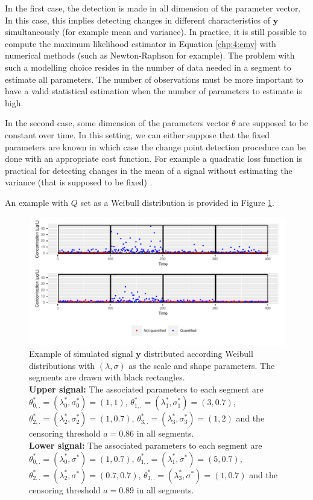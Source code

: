 In the first case,  the detection is made in all dimension of the parameter vector. In this case, this implies detecting changes in different characteristics of $\bm y$ simultaneously (for example mean and variance). In practice, it is still possible to compute the maximum likelihood estimator in Equation \ref{chp:4:emv} with numerical methods (such as Newton-Raphson for example). The problem with such a modelling choice resides in the number of data needed in a segment to estimate all parameters. The number of observations must be more important to have a valid statistical estimation when the number of parameters to estimate is high.  

In the second case, some dimension of the parameters vector $\theta$ are supposed to be constant over time. In this setting, we can either suppose that the fixed parameters are known in which case the change point detection procedure can be done with an appropriate cost function. For example a quadratic loss function is practical for detecting changes in the mean of a signal without estimating the variance (that is supposed to be fixed) \citep{Fearnhead2018a}. 

An example with $Q$ set as a Weibull distribution is provided in Figure \ref{fig:param_ex}. 
\begin{figure}[ht]
    \centering
    \includegraphics{figs/Chap4/param_ex.pdf}
    \caption{Example of simulated signal $\bm y$ distributed according Weibull distributions with $(\lambda,\sigma)$ as the scale and shape parameters. The segments are drawn with black rectangles. \\ 
\textbf{Upper signal:} The associated parameters to each segment are $\theta^*_{0,.} = (\lambda^*_0,\sigma^*_0) = (1,1)$, $\theta^*_{1,.} = (\lambda^*_1,\sigma^*_1) = (3,0.7)$, $\theta^*_{2,.} = (\lambda^*_2,\sigma^*_2) = (1,0.7)$, $\theta^*_{3,.} = (\lambda^*_3,\sigma^*_3) = (1,2)$ and the censoring threshold $a = 0.86$ in all segments.\\
\textbf{Lower signal:} The associated parameters to each segment are $\theta^*_{0,.} = (\lambda^*_0,\sigma^*) = (1,0.7)$, $\theta^*_{1,.} = (\lambda^*_1,\sigma^*) = (5,0.7)$, $\theta^*_{2,.} = (\lambda^*_2,\sigma^*) = (0.7,0.7)$, $\theta^*_{3,.} = (\lambda^*_3,\sigma^*) = (1,0.7)$ and the censoring threshold $a = 0.89$ in all segments.}
    \label{fig:param_ex}
\end{figure}

